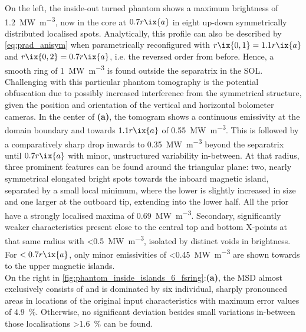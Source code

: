                 On the left, the inside-out turned phantom shows a maximum brightness of \SI{1.2}{\mega\watt\per\cubic\meter}, now in the core at $0.7r\ix{a}$ in eight up-down symmetrically distributed localised spots. Analytically, this profile can also be described by \cref{eq:prad_anisym} when parametrically reconfigured with $r\ix{0,1}=1.1r\ix{a}$ and $r\ix{0,2}=0.7r\ix{a}$, i.e. the reversed order from before. Hence, a smooth ring of \SI{1}{\mega\watt\per\cubic\meter} is found outside the separatrix in the SOL. Challenging with this particular phantom tomography is the potential obfuscation due to possibly increased interference from the symmetrical structure, given the position and orientation of the vertical and horizontal bolometer cameras. In the center of \textbf{(a)}, the tomogram shows a continuous emissivity at the domain boundary and towards $1.1r\ix{a}$ of \SI{0.55}{\mega\watt\per\cubic\meter}. This is followed by a comparatively sharp drop inwards to \SI{0.35}{\mega\watt\per\cubic\meter} beyond the separatrix until $0.7r\ix{a}$ with minor, unstructured variability in-between. At that radius, three prominent features can be found around the triangular plane: two, nearly symmetrical elongated bright spots towards the inboard magnetic island, separated by a small local minimum, where the lower is slightly increased in size and one larger at the outboard tip, extending into the lower half. All the prior have a strongly localised maxima of \SI{0.69}{\mega\watt\per\cubic\meter}. Secondary, significantly weaker characteristics present close to the central top and bottom X-points at that same radius with <\SI{0.5}{\mega\watt\per\cubic\meter}, isolated by distinct voids in brightness. For $<0.7r\ix{a}$, only minor emissivities of <\SI{0.45}{\mega\watt\per\cubic\meter} are shown towards to the upper magnetic islands.\\%
                On the right in \cref{fig:phantom_inside_islands_6_fsring}:\textbf{(a)}, the MSD almost exclusively consists of and is dominated by six individual, sharply pronounced areas in locations of the original input characteristics with maximum error values of \SI{4.9}{\percent}. Otherwise, no significant deviation besides small variations in-between those localisations >\SI{1.6}{\percent} can be found.\\%

